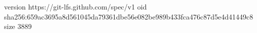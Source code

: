 version https://git-lfs.github.com/spec/v1
oid sha256:659ac3695a8d561045da79361dbe56e082be989b433fca476c87d5e4d41449c8
size 3889
